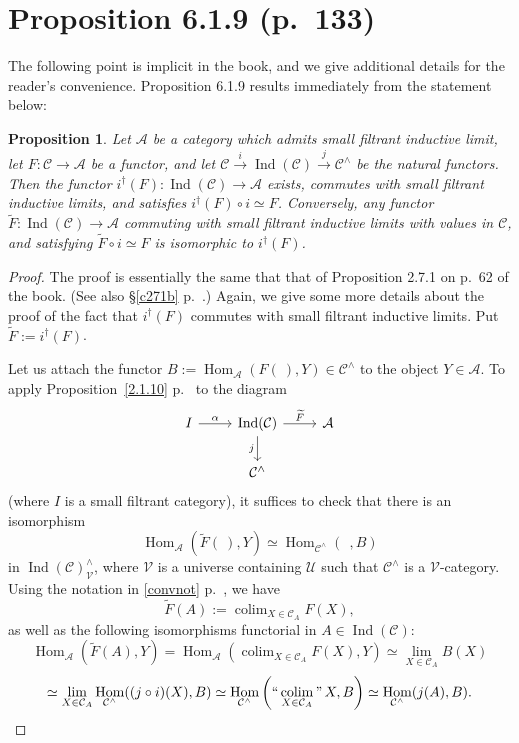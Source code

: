 \documentclass[12pt]{article}
\newtheorem{prop}[thm]{Proposition}
\theoremstyle{remark}
\theoremstyle{definition}
\newcommand{\A}{\mathcal A}
\newcommand{\C}{\mathcal C}
\newcommand{\U}{\mathcal U}
\newcommand{\V}{\mathcal V}
\DeclareMathOperator*{\coli}{colim}
\DeclareMathOperator*{\icolim}{``\coli"}
\DeclareMathOperator{\Hom}{Hom}%
\DeclareMathOperator{\Ind}{Ind}
\begin{document}
\section{Proposition 6.1.9 (p.~133)}\label{619} %
%
The following point is implicit in the book, and we give additional details for the reader's convenience. Proposition 6.1.9 results immediately from the statement below:
%
\begin{prop} 
Let $\A$ be a category which admits small filtrant inductive limit, let $F:\C\to\A$ be a functor, and let $\C\overset{i}{\to}\Ind(\C)\overset{j}{\to}\C^\wedge$ be the natural functors. Then the functor $i^\dagger(F):\Ind(\C)\to\A$ exists, commutes with small filtrant inductive limits, and satisfies $i^\dagger(F)\circ i\simeq F$. Conversely, any functor $\widetilde F:\Ind(\C)\to\A$ commuting with small filtrant inductive limits with values in $\C$, and satisfying $\widetilde F\circ i\simeq F$ is isomorphic to $i^\dagger(F)$. 
\end{prop} 
%
\begin{proof}
The proof is essentially the same that that of Proposition 2.7.1 on p.~62 of the book. (See also \S\ref{c271b} p.~\pageref{c271b}.) Again, we give some more details about the proof of the fact that $i^\dagger(F)$ commutes with small filtrant inductive limits. Put $\widetilde F:=i^\dagger(F)$. 

Let us attach the functor $B:=\Hom_\A(F(\ ),Y)\in\C^\wedge$ to the object $Y\in\A$. To apply Proposition~\ref{2.1.10} p.~\pageref{2.1.10} to the diagram 
$$
\begin{tikzcd}
I\ar{r}{\alpha}&\Ind(\C)\ar{d}[swap]{j}\ar{r}{\widetilde F}&\A\\
&\C^\wedge
\end{tikzcd}
$$
(where $I$ is a small filtrant category), it suffices to check that there is an isomorphism 
$$
\Hom_\A\left(\widetilde F(\ ),Y\right)\simeq
\Hom_{\C^\wedge}(\ \ ,B)
$$ 
in $\Ind(\C)^\wedge_\V$, where $\V$ is a universe containing $\U$ such that $\C^\wedge$ is a $\V$-category. Using the notation in \eqref{convnot} p.~\pageref{convnot}, we have 
$$
\widetilde F(A):=\coli_{X\in\C_A}F(X),
$$ 
as well as the following isomorphisms functorial in $A\in\Ind(\C)$:
$$
\Hom_\A\left(\widetilde F(A),Y\right)=
\Hom_\A\left(\coli_{X\in\C_A}F(X),Y\right)\simeq
\lim_{X\in\C_A}B(X)
$$
$$
\simeq
\lim_{X\in\C_A}\Hom_{\C^\wedge}((j\circ i)(X),B)
\simeq
\Hom_{\C^\wedge}\left(\icolim_{X\in\C_A}X,B\right)\simeq
\Hom_{\C^\wedge}(j(A),B).
$$
\end{proof}
\end{document}
